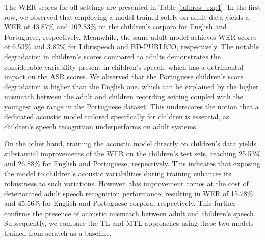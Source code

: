 
The \ac{WER} scores for all settings are presented in Table \ref{tab:res_exp1}. In the first row, we observed that employing a model trained solely on adult data yields a \ac{WER} of 43.87\% and 102.83\% on the children's corpora for English and Portuguese, respectively. Meanwhile, the same adult model achieves \ac{WER} scores of 6.53\% and 3.82\% for Librispeech and BD-PUBLICO, respectively. The notable degradation in children's scores compared to adults demonstrates the considerable variability present in children's speech, which has a detrimental impact on the \ac{ASR} scores. We observed that the Portuguese children's score degradation is higher than the English one, which can be explained by the higher mismatch between the adult and children recording setting coupled with the youngest age range in the Portuguese dataset. This underscores the notion that a dedicated acoustic model tailored specifically for children is essential, as children's speech recognition underperforms on adult systems.

On the other hand, training the acoustic model directly on children's data yields substantial improvements of the \ac{WER} on the children's test sets, reaching 25.53\% and 26.88\% for English and Portuguese, respectively. This indicates that exposing the model to children's acoustic variabilities during training enhances its robustness to such variations. However, this improvement comes at the cost of deteriorated adult speech recognition performance, resulting in \ac{WER} of 15.78\% and 45.56\% for English and Portuguese corpora, respectively. This further confirms the presence of acoustic mismatch between adult and children's speech. Subsequently, we compare the \ac{TL} and \ac{MTL} approaches using these two models trained from scratch as a baseline.

